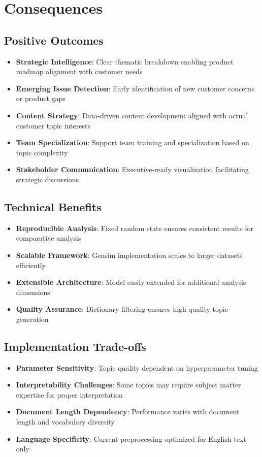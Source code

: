 \documentclass[11pt]{article}
\begin{document}
\section{Consequences}

\subsection{Positive Outcomes}
\begin{itemize}
\item \textbf{Strategic Intelligence}: Clear thematic breakdown enabling product roadmap alignment with customer needs
\item \textbf{Emerging Issue Detection}: Early identification of new customer concerns or product gaps
\item \textbf{Content Strategy}: Data-driven content development aligned with actual customer topic interests
\item \textbf{Team Specialization}: Support team training and specialization based on topic complexity
\item \textbf{Stakeholder Communication}: Executive-ready visualization facilitating strategic discussions
\end{itemize}

\subsection{Technical Benefits}
\begin{itemize}
\item \textbf{Reproducible Analysis}: Fixed random state ensures consistent results for comparative analysis
\item \textbf{Scalable Framework}: Gensim implementation scales to larger datasets efficiently
\item \textbf{Extensible Architecture}: Model easily extended for additional analysis dimensions
\item \textbf{Quality Assurance}: Dictionary filtering ensures high-quality topic generation
\end{itemize}

\subsection{Implementation Trade-offs}
\begin{itemize}
\item \textbf{Parameter Sensitivity}: Topic quality dependent on hyperparameter tuning
\item \textbf{Interpretability Challenges}: Some topics may require subject matter expertise for proper interpretation
\item \textbf{Document Length Dependency}: Performance varies with document length and vocabulary diversity
\item \textbf{Language Specificity}: Current preprocessing optimized for English text only
\end{itemize}
\end{document}
